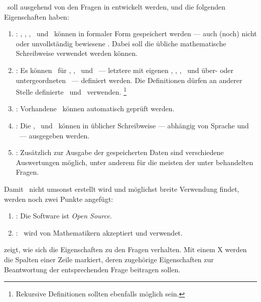 \ASBA\ soll ausgehend von den Fragen in  entwickelt werden, und die folgenden Eigenschaften haben:
\begin{enumerate}
	\item \label{Eigenschaft:Daten} :
	\Axiome, \Saetze, \Beweise, \Fachbegriffe\ und \Fachgebiete\ können in formaler Form gespeichert werden --- auch (noch) nicht oder unvollständig bewiesene \Saetze.
	Dabei soll die übliche mathematische Schreibweise verwendet werden können.
	\item \label{Eigenschaft:Definitionen} :
	Es können \Fachbegriffe\ für \Axiome, \Saetze, \Beweise\ und \Fachgebiete\ --- letztere mit eigenen \Axiomen, \Saetzen, \Beweisen, \Fachbegriffen\ und über- oder untergeordneten \Fachgebieten\ --- definiert werden.
	Die Definitionen dürfen an anderer Stelle definierte \Fachbegriffe\ und \Fachgebiete\ verwenden.%
	\footnote{Rekursive Definitionen sollten ebenfalls möglich sein.}
	\item \label{Eigenschaft:Pruefung} :
	Vorhandene \Beweise\ können automatisch geprüft werden.
	\item \label{Eigenschaft:Ausgaben} :
	Die \Axiome, \Saetze\ und \Beweise\ können in üblicher Schreibweise --- abhängig von Sprache und \Fachgebiet\ --- ausgegeben werden.
	\item \label{Eigenschaft:Auswertungen} :
	Zusätzlich zur Ausgabe der gespeicherten Daten sind verschiedene Auswertungen möglich, unter anderem für die meisten der unter  behandelten Fragen.
	\setcounter{Enumi}{\value{enumi}}%
\end{enumerate}
%
Damit \ASBA\ nicht umsonst erstellt wird und möglichst breite Verwendung findet, werden noch zwei Punkte angefügt:
\begin{enumerate}
	\setcounter{enumi}{\value{Enumi}}%
	\item \label{Eigenschaft:Lizenz} :
	Die Software ist \emph{Open Source}.
	\item \label{Eigenschaft:Akzeptanz} :
	\ASBA\ wird von Mathematikern akzeptiert und verwendet.
\end{enumerate}
%
 zeigt, wie sich die Eigenschaften zu den Fragen  verhalten.
Mit einem X werden die Spalten einer Zeile markiert, deren zugehörige Eigenschaften zur Beantwortung der entsprechenden Frage beitragen sollen.
